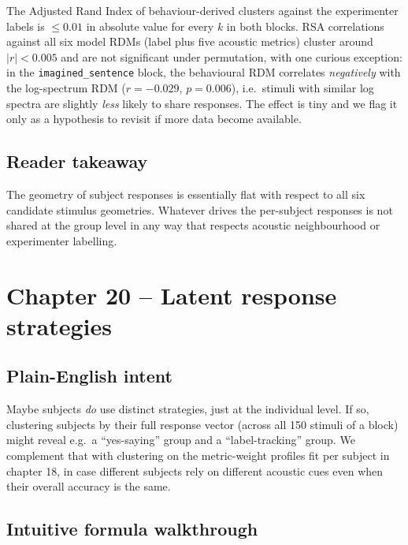 \documentclass[11pt]{article}
\begin{document}
The Adjusted Rand Index of behaviour-derived clusters against the
experimenter labels is $\le 0.01$ in absolute value for every $k$ in both
blocks. RSA correlations against all six model RDMs (label plus five
acoustic metrics) cluster around $|r|<0.005$ and are not significant under
permutation, with one curious exception: in the
\texttt{imagined\_sentence} block, the behavioural RDM correlates
\emph{negatively} with the log-spectrum RDM ($r=-0.029$, $p=0.006$),
i.e.\ stimuli with similar log spectra are slightly \emph{less} likely to
share responses. The effect is tiny and we flag it only as a hypothesis to
revisit if more data become available.

\subsection{Reader takeaway}

The geometry of subject responses is essentially flat with respect to all
six candidate stimulus geometries. Whatever drives the per-subject responses
is not shared at the group level in any way that respects acoustic
neighbourhood or experimenter labelling.

\section{Chapter 20 -- Latent response strategies}

\subsection{Plain-English intent}

Maybe subjects \emph{do} use distinct strategies, just at the individual
level. If so, clustering subjects by their full response vector (across all
150 stimuli of a block) might reveal e.g.\ a ``yes-saying'' group and a
``label-tracking'' group. We complement that with clustering on the
metric-weight profiles fit per subject in chapter 18, in case different
subjects rely on different acoustic cues even when their overall accuracy
is the same.

\subsection{Intuitive formula walkthrough}
\end{document}

